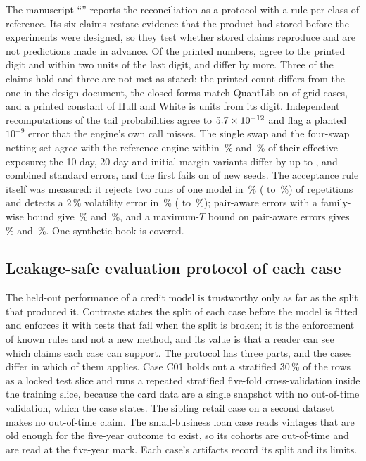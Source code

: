 The manuscript ``\pxPaperTitleTwo{}'' reports the reconciliation as a protocol with a rule per class of reference. Its six claims restate evidence that the
product had stored before the experiments were designed, so they test whether stored claims reproduce and are not predictions made in advance. Of the
\pxPpTwoPrintedN{} printed numbers, \pxPpTwoPrintedAgree{} agree to the printed digit and \pxPpTwoWithinTwo{} within two units of the last digit, and \pxPpTwoBeyond{}
differ by more. Three of the claims hold and three are not met as stated: the printed count differs from the one in the design document, the closed forms match
QuantLib on \pxPpTwoClosedWithin{} of \pxPpTwoClosedCases{} grid cases, and a printed constant of Hull and White is \pxPpTwoHw{} units from its digit.
Independent recomputations of the tail probabilities agree to $5.7\times10^{-12}$ and flag a planted $10^{-9}$ error that the engine's own call misses. The single
swap and the four-swap netting set agree with the reference engine within \pxPpTwoSingle{}\,\% and \pxPpTwoNetting{}\,\% of their effective exposure; the
10-day, 20-day and initial-margin variants differ by up to \pxPpTwoCsaTenMax{}, \pxPpTwoCsaTwentyMax{} and \pxPpTwoImMax{} combined standard errors, and the first
fails on \pxPpTwoReplFail{} of \pxPpTwoReplN{} new seeds. The acceptance rule itself was measured: it rejects two runs of one model in \pxPpTwoSizeProd{}\,\%
(\pxPpTwoSizeProdLo{} to \pxPpTwoSizeProdHi{}\,\%) of \pxPpTwoCritReps{} repetitions and detects a $2\,\%$ volatility error in \pxPpTwoPowerProd{}\,\%
(\pxPpTwoPowerProdLo{} to \pxPpTwoPowerProdHi{}\,\%); pair-aware errors with a family-wise bound give \pxPpTwoSizeRefine{}\,\% and \pxPpTwoPowerRefine{}\,\%, and a
maximum-$T$ bound on pair-aware errors gives \pxPpTwoSizeMaxt{}\,\% and \pxPpTwoPowerMaxt{}\,\%. One synthetic book is covered.

\subsection{Leakage-safe evaluation protocol of each case}
\label{sec:bs3}

The held-out performance of a credit model is trustworthy only as far as the split that produced it. Contraste states the split of each case
before the model is fitted and enforces it with tests that fail when the split is broken; it is the enforcement of known rules and not a new
method, and its value is that a reader can see which claims each case can support. The protocol has three parts, and the cases differ in
which of them applies. Case C01 holds out a stratified 30\,\% of the rows as a locked test slice and runs a repeated stratified five-fold
cross-validation inside the training slice, because the card data are a single snapshot with no out-of-time validation, which the case states.
The sibling retail case on a second dataset makes no out-of-time claim. The small-business loan case reads vintages that are old enough for
the five-year outcome to exist, so its cohorts are out-of-time and are read at the five-year mark. Each case's artifacts record its split and its limits.

